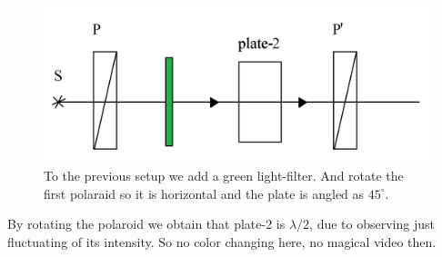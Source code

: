 \begin{minipage}{0.55\textwidth}
    \begin{figure}[h]
    \centering
    \includegraphics[width=1\textwidth]{images/greeeeeen2.png}
    \caption{To the previous setup we add a green light-filter. And rotate the first polaraid so it is horizontal and the plate is  angled as $45^\circ$.}
\end{figure}
\end{minipage}
\hfill
\begin{minipage}{0.35\textwidth}
    By rotating the polaroid we obtain that plate-2 is $\lambda/2$, due to observing just fluctuating of its intensity. So no color changing here, no magical video then.
\end{minipage}
